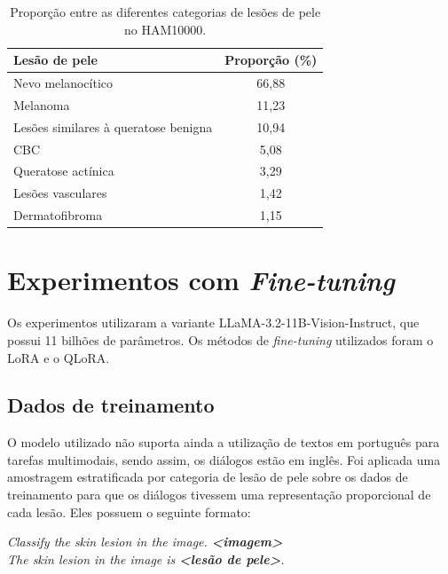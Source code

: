 \begin{table}[ht]
    \caption{\small Proporção entre as diferentes categorias de lesões de pele no \ac{HAM10000}.}
    \centering
    \begin{tabular}{l|c}
        \hline
        Lesão de pele                        & Proporção (\%) \\ \hline
        Nevo melanocítico                    & 66,88          \\
        Melanoma                             & 11,23          \\
        Lesões similares à queratose benigna & 10,94          \\
        \ac{CBC}                             & 5,08           \\
        Queratose actínica                   & 3,29           \\
        Lesões vasculares                    & 1,42           \\
        Dermatofibroma                       & 1,15           \\ \hline
    \end{tabular}
    \label{tab:ham10000_proportion}
\end{table}

\section{Experimentos com \textit{Fine-tuning}}

Os experimentos utilizaram a variante \ac{LLaMA}-3.2-11B-Vision-Instruct, que possui 11 bilhões de parâmetros. Os métodos de \textit{fine-tuning} utilizados foram o
\ac{LoRA} e o \ac{QLoRA}.

\subsection{Dados de treinamento}

O modelo utilizado não suporta ainda a utilização de textos em português para tarefas multimodais, sendo assim, os diálogos estão em inglês. Foi aplicada uma amostragem
estratificada por categoria de lesão de pele sobre os dados de treinamento para que os diálogos tivessem uma representação proporcional de cada lesão. Eles possuem o
seguinte formato:

\begin{dialogue}
     \textit{Classify the skin lesion in the image. \textbf{<imagem>}} \\
     \textit{The skin lesion in the image is \textbf{<lesão de pele>}.}
\end{dialogue}

